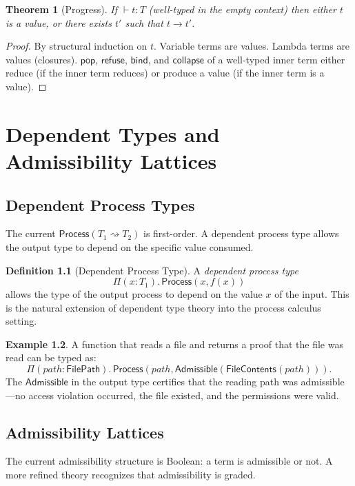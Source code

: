 \documentclass[12pt, a4paper, openany]{book}
\theoremstyle{plain}
\newtheorem{theorem}{Theorem}[chapter]
\theoremstyle{definition}
\newtheorem{definition}[theorem]{Definition}
\newtheorem{example}[theorem]{Example}
\theoremstyle{remark}
\newcommand{\Adm}{\mathsf{Admissible}}
\newcommand{\Proc}{\mathsf{Process}}
\begin{document}
\begin{theorem}[Progress]
If $\vdash t : T$ (well-typed in the empty context) then either $t$ is a value,
or there exists $t'$ such that $t \to t'$.
\end{theorem}

\begin{proof}
By structural induction on $t$. Variable terms are values. Lambda terms are values
(closures). $\mathsf{pop}$, $\mathsf{refuse}$, $\mathsf{bind}$, and
$\mathsf{collapse}$ of a well-typed inner term either reduce (if the inner term
reduces) or produce a value (if the inner term is a value).
\end{proof}

\chapter{Dependent Types and Admissibility Lattices}

\section{Dependent Process Types}

The current $\Proc(T_1 \rightsquigarrow T_2)$ is first-order. A dependent process
type allows the output type to depend on the specific value consumed.

\begin{definition}[Dependent Process Type]
A \emph{dependent process type}
\[
\Pi(x : T_1).\, \Proc(x, f(x))
\]
allows the type of the output process to depend on the value $x$ of the input.
This is the natural extension of dependent type theory into the process calculus
setting.
\end{definition}

\begin{example}
A function that reads a file and returns a proof that the file was read can be
typed as:
\[
\Pi(\mathit{path} : \mathsf{FilePath}).\, \Proc(\mathit{path}, \Adm(\mathsf{FileContents}(\mathit{path}))).
\]
The $\Adm$ in the output type certifies that the reading path was admissible---no
access violation occurred, the file existed, and the permissions were valid.
\end{example}

\section{Admissibility Lattices}

The current admissibility structure is Boolean: a term is admissible or not. A
more refined theory recognizes that admissibility is graded.
\end{document}
